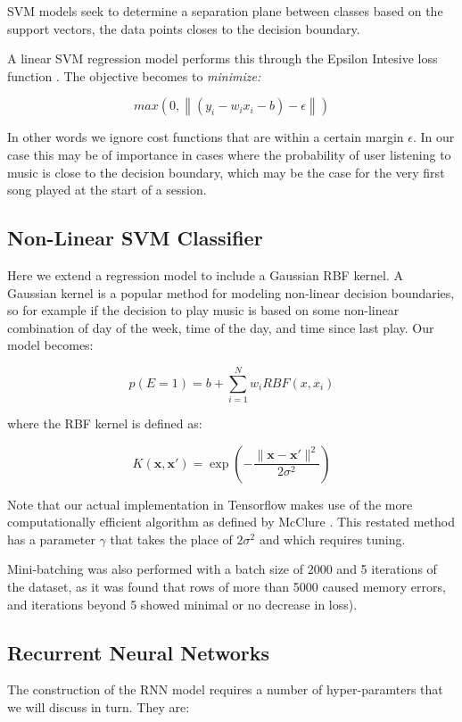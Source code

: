 SVM models seek to determine a separation plane between classes based on the support vectors, the data points closes to the decision boundary.

A linear SVM regression model performs this through the Epsilon Intesive loss function \parencite{Vapnik}. The objective becomes to \textit{minimize:}

$$max(0,\left\| (y_i - w_i x_i - b) - \epsilon \right\|)$$

In other words we ignore cost functions that are within a certain margin  $\epsilon$. In our case this may be of importance in cases where the probability of user listening to music is close to the decision boundary, which may be the case for the very first song played at the start of a session.

\subsection{Non-Linear SVM Classifier}

Here we extend a regression model to include a Gaussian RBF kernel. A Gaussian kernel is a popular method for modeling non-linear decision boundaries, so for example if the decision to play music is based on some non-linear combination of day of the week, time of the day, and time since last play. Our model becomes:

$$p(E=1)=b+\sum^N_{i=1}w_iRBF(x,x_i)$$

where the RBF kernel is defined as:

$$K(\mathbf {x} ,\mathbf {x'} )=\exp \left(-{\frac {\|\mathbf {x} -\mathbf {x'} \|^{2}}{2\sigma ^{2}}}\right)$$

Note that our actual implementation in Tensorflow makes use of the more computationally efficient algorithm as defined by McClure \parencite{TFCookbook}. This restated method has a parameter $\gamma$ that takes the place of $2\sigma^2$ and which requires tuning.

Mini-batching was also performed with a batch size of 2000 and 5 iterations of the dataset, as it was found that rows of more than 5000 caused memory errors, and iterations beyond 5 showed minimal or no decrease in loss).

\subsection{Recurrent Neural Networks}

The construction of the RNN model requires a number of hyper-paramters that we will discuss in turn. They are:

